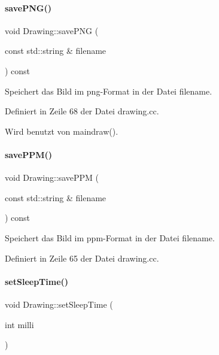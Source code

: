\paragraph{\texorpdfstring{save\+P\+N\+G()}{savePNG()}}
{\footnotesize\ttfamily void Drawing\+::save\+P\+NG (\begin{DoxyParamCaption}\item[{const std\+::string \&}]{filename }\end{DoxyParamCaption}) const}



Speichert das Bild im png-\/\+Format in der Datei {\ttfamily filename}. 



Definiert in Zeile 68 der Datei drawing.\+cc.



Wird benutzt von maindraw().

\mbox{\label{classDrawing_a8e6f3bd4617ef1f84635c6983a4840c1}} 
\paragraph{\texorpdfstring{save\+P\+P\+M()}{savePPM()}}
{\footnotesize\ttfamily void Drawing\+::save\+P\+PM (\begin{DoxyParamCaption}\item[{const std\+::string \&}]{filename }\end{DoxyParamCaption}) const}



Speichert das Bild im ppm-\/\+Format in der Datei {\ttfamily filename}. 



Definiert in Zeile 65 der Datei drawing.\+cc.

\mbox{\label{classDrawing_a34754d4f4d6e129dae03f058d76dd43f}} 
\paragraph{\texorpdfstring{set\+Sleep\+Time()}{setSleepTime()}}
{\footnotesize\ttfamily void Drawing\+::set\+Sleep\+Time (\begin{DoxyParamCaption}\item[{int}]{milli }\end{DoxyParamCaption})\hspace{0.3cm}{\ttfamily [inline]}}



